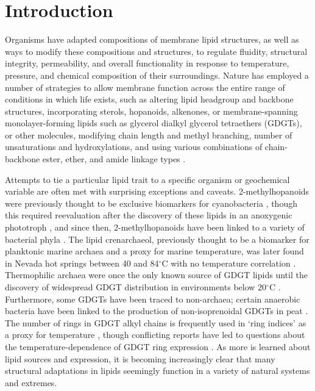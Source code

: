 \section{Introduction}
Organisms have adapted compositions of membrane lipid structures, as well as ways to modify these compositions and structures, to regulate fluidity, structural integrity, permeability, and overall functionality in response to temperature, pressure, and chemical composition of their surroundings. Nature has employed a number of strategies to allow membrane function across the entire range of conditions in which life exists, such as altering lipid headgroup and backbone structures, incorporating sterols, hopanoids, alkenones, or membrane-spanning monolayer-forming lipids such as glycerol dialkyl glycerol tetraethers (GDGTs), or other molecules, modifying chain length and methyl branching, number of unsaturations and hydroxylations, and using various combinations of chain-backbone ester, ether, and amide linkage types \citep{marlowe1984long, belin2018hopanoid, van2008membrane}.

Attempts to tie a particular lipid trait to a specific organism or geochemical variable are often met with surprising exceptions and caveats. 2-methylhopanoids were previously thought to be exclusive biomarkers for cyanobacteria \citep{summons1992methylhopanoids}, though this required reevaluation after the discovery of these lipids in an anoxygenic phototroph \citep{rashby2007biosynthesis}, and since then, 2-methylhopanoids have been linked to a variety of bacterial phyla \citep{ricci2014diverse}. The lipid crenarchaeol, previously thought to be a biomarker for planktonic marine archaea and a proxy for marine temperature, was later found in Nevada hot springs between 40 and 84$^{\circ}$C with no temperature correlation \citep{pearson2004nonmarine}. Thermophilic archaea were once the only known source of GDGT lipids until the discovery of widespread GDGT distribution in environments below 20$^{\circ}$C \citep{schouten2000widespread}. Furthermore, some GDGTs have been traced to non-archaea; certain anaerobic bacteria have been linked to the production of non-isoprenoidal GDGTs in peat \citep{weijers2006membrane}. The number of rings in GDGT alkyl chains is frequently used in `ring indices' as a proxy for temperature \citep{schouten2002distributional, tierney2012gdgt}, though conflicting reports have led to questions about the temperature-dependence of GDGT ring expression \citep{sollich2017heat}. As more is learned about lipid sources and expression, it is becoming increasingly clear that many structural adaptations in lipids seemingly function in a variety of natural systems and extremes.

